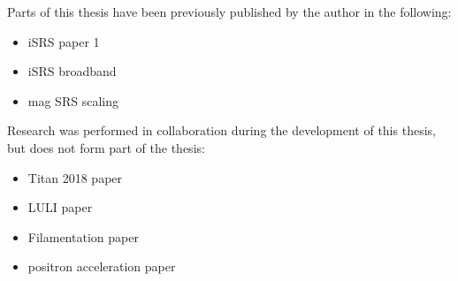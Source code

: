 
\begin{thesisdeclaration}

\noindent Parts of this thesis have been previously published by the author in the following:
\begin{itemize}
    \item iSRS paper 1
    \item iSRS broadband
    \item mag SRS scaling
\end{itemize}{}


\noindent Research was performed in collaboration during the development of this thesis, but does not form part of the thesis:
\begin{itemize}
    \item Titan 2018 paper
    \item LULI paper
    \item Filamentation paper
    \item positron acceleration paper
\end{itemize}{}

\end{thesisdeclaration}
